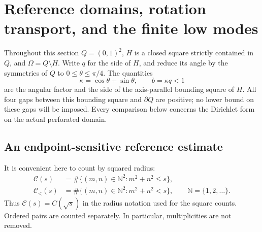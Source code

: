 \documentclass[11pt,reqno]{amsart}
\numberwithin{equation}{section}
\begin{document}
\section{Reference domains, rotation transport, and the finite low modes}
\label{rot:section}

Throughout this section $Q=(0,1)^2$, $H$ is a closed square strictly
contained in $Q$, and $\Omega=Q\setminus H$. Write $q$ for the side of
$H$, and reduce its angle by the symmetries of $Q$ to
$0\leq\theta\leq\pi/4$. The quantities
\begin{equation}\label{rot:box-parameters}
 \kappa=\cos\theta+\sin\theta,\qquad b=\kappa q<1
\end{equation}
are the angular factor and the side of the axis-parallel bounding square
of $H$. All four gaps between this bounding square and $\partial Q$ are
positive; no lower bound on these gaps will be imposed. Every comparison
below concerns the Dirichlet form on the actual perforated domain.

\subsection{An endpoint-sensitive reference estimate}
\label{rot:reference}

It is convenient here to count by squared radius:
\begin{equation}\label{rot:squared-count}
 \begin{aligned}
 \mathcal C(s)&=\#\{(m,n)\in\mathbb N^2:m^2+n^2\leq s\},\\
 \mathcal C_{<}(s)&=\#\{(m,n)\in\mathbb N^2:m^2+n^2<s\},
 \qquad \mathbb N=\{1,2,\ldots\}.
 \end{aligned}
\end{equation}
Thus $\mathcal C(s)=C(\sqrt{s})$ in the radius notation used for the
square counts. Ordered pairs are counted separately. In particular,
multiplicities are not removed.
\end{document}
